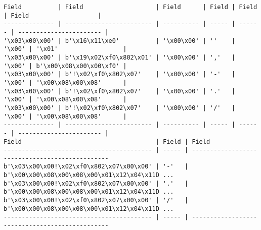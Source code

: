 \begin{verbatim}
Field          | Field                    | Field      | Field | Field  | Field                   |
-------------- | ------------------------ | ---------- | ----- | ------ | ----------------------- | 
'\x03\x00\x00' | b'\x16\x11\xe0'          | '\x00\x00' | ''    | '\x00' | '\x01'                  | 
'\x03\x00\x00' | b'\x19\x02\xf0\x802\x01' | '\x00\x00' | ','   | '\x00' | b'\x00\x08\x00\x00\xf0' | 
'\x03\x00\x00' | b'!\x02\xf0\x802\x07'    | '\x00\x00' | '-'   | '\x00' | '\x00\x08\x00\x08'      | 
'\x03\x00\x00' | b'!\x02\xf0\x802\x07'    | '\x00\x00' | '.'   | '\x00' | '\x00\x08\x00\x08'      | 
'\x03\x00\x00' | b'!\x02\xf0\x802\x07'    | '\x00\x00' | '/'   | '\x00' | '\x00\x08\x00\x08'      | 
-------------- | ------------------------ | ---------- | ----- | ------ | ----------------------- | 
Field                                     | Field | Field                                          
----------------------------------------- | ----- | -----------------------------------------------
b'\x03\x00\x00!\x02\xf0\x802\x07\x00\x00' | '-'   | b'\x00\x00\x08\x00\x08\x00\x01\x12\x04\x11D ...
b'\x03\x00\x00!\x02\xf0\x802\x07\x00\x00' | '.'   | b'\x00\x00\x08\x00\x08\x00\x01\x12\x04\x11D ...
b'\x03\x00\x00!\x02\xf0\x802\x07\x00\x00' | '/'   | b'\x00\x00\x08\x00\x08\x00\x01\x12\x04\x11D ...
----------------------------------------- | ----- | -----------------------------------------------
\end{verbatim}
